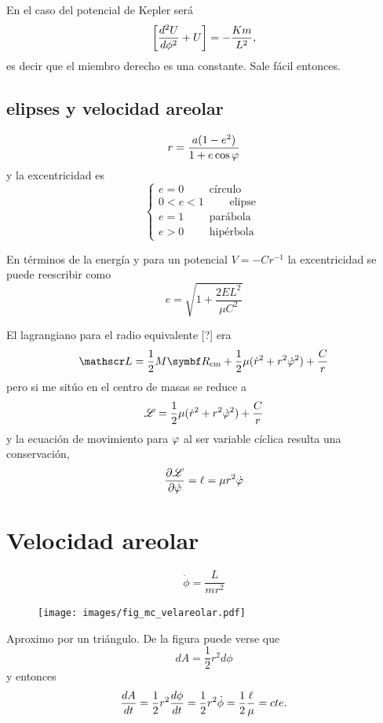 \documentclass[10pt,oneside]{CBFT_book}
\begin{document}
En el caso del potencial de Kepler será 
\[
	\left[ \dtot[2]{U}{\phi} + U \right] = - \frac{K m}{L^2},
\]
es decir que el miembro derecho es una constante. Sale fácil entonces.

\subsection{elipses y velocidad areolar}

\[
	r = \frac{a(1-e^2)}{1 + e\cos\vp}
\]
y la excentricidad es 
\[
	\begin{cases}
	e = 0 \qquad \text{ círculo } \\
	0 < e < 1 \qquad \text{ elipse } \\
	e = 1 \qquad \text{ parábola } \\
	e > 0 \qquad \text{ hipérbola }
	\end{cases}
\]

En términos de la energía y para un potencial $ V = - Cr^{-1}$ la excentricidad se puede reescribir como 
\[
	e = \sqrt{ 1 + \frac{2EL^2}{\mu C^2} }
\]

El lagrangiano para el radio equivalente [?] era
\[
	\Lag = \frac{1}{2} M \vb{R}_{\text{cm}} + \frac{1}{2} \mu (\dot{r}^2 + r^2 \dot{\vp}^2) + \frac{C}{r}
\]
pero si me sitúo en el centro de masas se reduce a 
\[
	\Lag = \frac{1}{2} \mu (\dot{r}^2 + r^2 \dot{\vp}^2) + \frac{C}{r}
\]
y la ecuación de movimiento para $ \vp $ al ser variable cíclica resulta una conservación,
\[
	\dpar{\Lag}{\dot{\vp}} = \ell = \mu r^2 \dot{\vp}
\]

\section{Velocidad areolar}

\[
	\dot{\phi} = \frac{L}{m r^2}
\]
\begin{figure}[hbt]
	\begin{center}
	\texttt{[image: images/fig\_mc\_velareolar.pdf]}	 
	\end{center}
	\caption{}
\end{figure} 
Aproximo por un triángulo.
De la figura puede verse que 
\[
	dA = \frac{1}{2} r^2 d\phi 
\]
y  entonces
\[
	\dtot{A}{t} = \frac{1}{2} r^2 \dtot{\phi}{t} = \frac{1}{2} r^2 \dot{\phi} = \frac{1}{2}\frac{\ell}{\mu} = cte.
\]
\end{document}
